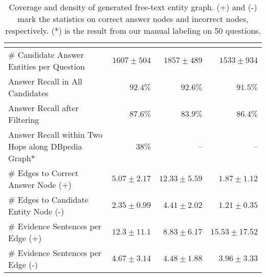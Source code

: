 
\begin{table*}[t]
  \centering
  \begin{tabular}{lrrr}
      & \textbf{\qblink{}} & \textbf{\qanta{}} & \textbf{\triviaqa{}}  \\ \toprule
    \# Candidate Answer Entities per Question &$1607\pm 504$ & $1857 \pm 489$ & $1533\pm 934$\\ 
    Answer Recall in All Candidates
    & $92.4\%$&$92.6\%$  &$91.5\%$\\
    Answer Recall after Filtering
    & $87.6\%$& $83.9\%$ &$86.4\%$ \\ 
    Answer Recall within Two Hops along DBpedia Graph* & 38\% & -- & -- \\
    \midrule
    \# Edges to Correct Answer Node (+) & $5.07\pm2.17$&$12.33\pm5.59$ &$1.87\pm 1.12$\\
    \# Edges to Candidate Entity Node (-) & $2.35\pm0.99$ & $4.41\pm2.02$& $1.21\pm0.35$ \\ 
    \# Evidence Sentences per Edge (+) & $12.3\pm11.1$& $8.83\pm6.17$ & $15.53\pm17.52$ \\ 
    \# Evidence Sentences per Edge (-) &$4.67\pm 3.14$& $4.48\pm1.88$&$3.96\pm3.33$\\
    \bottomrule
  \end{tabular}
  \caption{Coverage and density of generated free-text entity graph. 
  (+) and (-) mark the statistics on correct answer nodes and incorrect nodes, respectively.
  (*) is the result from our manual labeling on 50 \qblink{} questions.
  \label{tab:coverage}}
  
\end{table*}
